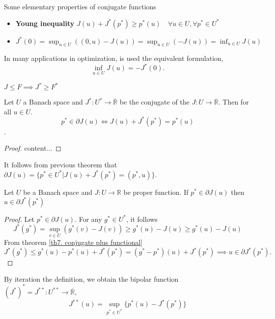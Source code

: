 \begin{remark}
Some elementary properties of conjugate functions
\begin{itemize}
	\item  \textbf{Young inequality} $J(u)+J^*(p^*)\geq p^*(u) \quad \forall u \in U, \forall p^* \in U^*$
	\item  $J^*(0)=\sup_{u\in U}\left((0,u)-J(u)\right)=\sup_{u\in U}\left(-J(u)\right)=\inf_{u\in U}J(u)$
\end{itemize}
In many applications in optimization, is used the equivalent formulation,
\[
\inf_{u\in U}J(u)=-J^*(0).
\]
\end{remark}
$J\leq F \implies J^*\geq F^*$

\begin{theorem}
	Let $U$ a Banach space and $J^*: U^* \rightarrow \overline{\mathbb{R}}$ be the conjugate of the $J:U\rightarrow \overline{\mathbb{R}}$. Then for all $u\in U$. \[p^* \in \partial J(u) \iff J(u)+J^*(p^*)=p^*(u)\]. \label{th7. conjugate plus functional}
	\begin{proof}
		content...
	\end{proof}
\end{theorem}
\begin{corollary}
	It follows from previous theorem that $\partial J(u)=\lbrace p^* \in U^* | J(u)+J^*(p^*)=(p^*, u)\rbrace$.
\end{corollary}
\begin{theorem}
	Let $U$ be a Banach space and $J:U\rightarrow \mathbb{R}$ be proper function. If $p^* \in \partial J(u)$ then $u\in \partial J^* (p^*)$
	\begin{proof}
		Let $p^*\in \partial J(u)$. For any $g^* \in U^*$, it follows \[J^*(g^*)=\sup_{v\in U} \left(g^*(v)-J(v)\right)\geq g^*(u)-J(u)\geq g^*(u)-J(u)\]
		From theorem \ref{th7. conjugate plus functional} 
		\[
		J^*(g^*)\leq g^*(u)-p^*(u)+J^*(p^*) = \left(g^* - p^* \right)(u)+J^*(p^*)\implies u\in \partial J^*(p^*).
		\]
	\end{proof}
\end{theorem}
By iteration the definition, we obtain the bipolar function
$(J^*)^*=J^{**}: U^{**}\rightarrow \overline{\mathbb{R}}$, 
\[
	J^{**}(u)=\sup_{p^*\in U^*} \lbrace p^*(u)-J^*(p^*) \rbrace
\]

